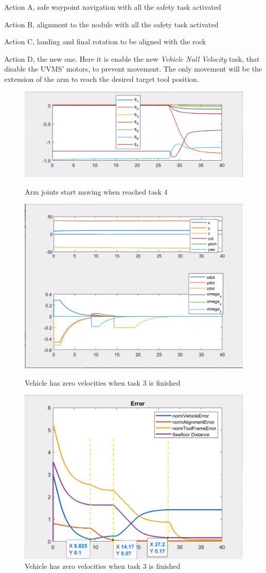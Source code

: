 \documentclass{article}
\begin{document}
\begin{description}
	\item Action A, safe waypoint navigation with all the safety task activated
	\item Action B, alignment to the nodule with all the safety task activated
	\item Action C, landing and final rotation to be aligned with the rock
	\item Action D, the new one. Here it is enable the new \textit{Vehicle Null Velocity} task, that disable the UVMS' motors, to prevent movement. The only movement will be the extension of the arm to reach the desired target tool position.
\end{description}

\begin{figure}[htp]
\centering
\includegraphics[width=.6\textwidth]{411_q.png}\caption{Arm joints start moving when reached task 4}
\centering
\label{fig:411_arm}
\includegraphics[width=.6\textwidth]{411_ppdot.png}\caption{Vehicle has zero velocities when task 3 is finished}
\label{fig:411_vehicle}
\includegraphics[width=.6\textwidth]{411_Errors.png}\caption{Vehicle has zero velocities when task 3 is finished}
\label{fig:411_errors}
\end{figure}
\end{document}
